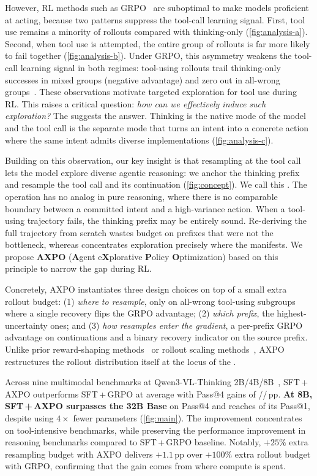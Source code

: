 However, RL methods such as GRPO~\citep{GRPO,DAPO,prorl} are suboptimal to make models proficient at acting, because two patterns suppress the tool-call learning signal.
First, tool use remains a minority of rollouts compared with thinking-only (\autoref{fig:analysis-a}).
Second, when tool use is attempted, the entire group of rollouts is far more likely to fail together (\autoref{fig:analysis-b}).
Under GRPO, this asymmetry weakens the tool-call learning signal in both regimes: tool-using rollouts trail thinking-only successes in mixed groups (negative advantage) and zero out in all-wrong groups~\citep{pope, sage}.
These observations motivate targeted exploration for tool use during RL. This raises a critical question: \emph{how can we effectively induce such exploration?}
The \gap suggests the answer.
Thinking is the native mode of the model and the tool call is the separate mode that turns an intent into a concrete action where the same intent admits diverse implementations (\autoref{fig:analysis-c}).

Building on this observation, our key insight is that resampling at the tool call lets the model explore diverse agentic reasoning: we anchor the thinking prefix and resample the tool call and its continuation (\autoref{fig:concept}).
We call this \emph{\toolresample}.
The operation has no analog in pure reasoning, where there is no comparable boundary between a committed intent and a high-variance action.
When a tool-using trajectory fails, the thinking prefix may be entirely sound. Re-deriving the full trajectory from scratch wastes budget on prefixes that were not the bottleneck, whereas \toolresample concentrates exploration precisely where the \gap manifests. We propose \textbf{AXPO} (\textbf{A}gent e\textbf{X}plorative \textbf{P}olicy \textbf{O}ptimization) based on this principle to narrow the gap during RL.

Concretely, AXPO instantiates three design choices on top of a small extra rollout budget: (1) \emph{where to resample}, only on all-wrong tool-using subgroups where a single recovery flips the GRPO advantage;
(2) \emph{which prefix}, the highest-uncertainty ones; and (3) \emph{how resamples enter the gradient}, a per-prefix GRPO advantage on continuations and a binary recovery indicator on the source prefix.
Unlike prior reward-shaping methods~\citep{pyvision-rl, deepeyesv2, otc} or rollout scaling methods~\citep{brorl, arpo}, AXPO restructures the rollout distribution itself at the locus of the \gap.

Across nine multimodal benchmarks at Qwen3-VL-Thinking 2B/4B/8B~\citep{Qwen3VL}, SFT\,+\,AXPO outperforms SFT\,+\,GRPO at average with Pass@4 gains of \dPassFourTwoB/\dPassFourFourB/\dPassFourEightB\,pp.
\textbf{At 8B, SFT\,+\,AXPO surpasses the 32B Base} on Pass@4 and reaches \eightBPassOneReachPct{} of its Pass@1, despite using $4\times$ fewer parameters (\autoref{fig:main}). The improvement concentrates on tool-intensive benchmarks, while preserving the performance improvement in reasoning benchmarks compared to SFT\,+\,GRPO baseline. Notably, $+25\%$ extra resampling budget with AXPO delivers $+1.1$\,pp over $+100\%$ extra rollout budget with GRPO, confirming that the gain comes from where compute is spent.

